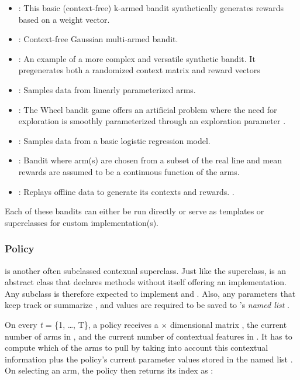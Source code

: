 \documentclass{jss}
\begin{document}
\begin{itemize}
         \item {}: This basic (context-free) k-armed bandit synthetically generates rewards based on a weight vector.
         \item {}: Context-free Gaussian multi-armed bandit.
         \item {}: An example of a more complex and versatile synthetic bandit. It pregenerates both a randomized context matrix and reward vectors
         \item {}: Samples data from linearly parameterized arms.
         \item {}: The Wheel bandit game offers an artificial problem where the need for exploration is smoothly parameterized through an exploration parameter \citep{Riquelme2018}.
         \item {}: Samples data from a basic logistic regression model.
         \item {}: Bandit where arm(s) are chosen from a subset of the real line and mean rewards are assumed to be a continuous function of the arms.
         \item {}: Replays offline data to generate its contexts and rewards.  \cite{Li2010}.
\end{itemize}

Each of these bandits can either be run directly or serve as templates or superclasses for custom  implementation(s).

\subsubsection{Policy}

 is another often subclassed contexual superclass. Just like the  superclass,  is an abstract class that declares methods without itself offering an implementation. Any  subclass is therefore expected to implement  and . Also, any parameters that keep track or summarize ,  and  values are required to be saved to 's \textit{named list} .

On every \emph{t} = \{1, \ldots, T\}, a policy receives a  $\times$  dimensional matrix , the current number of  arms in , and the current number of contextual features in . It has to compute which of the   arms to pull by taking into account this contextual information plus the policy's current parameter values stored in the named list . On selecting an arm, the policy then returns its index as :
\end{document}
